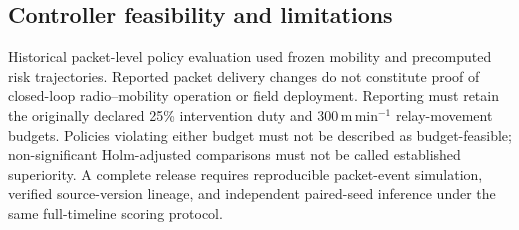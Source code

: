 \subsection{Controller feasibility and limitations}
Historical packet-level policy evaluation used frozen mobility and precomputed
risk trajectories. Reported packet delivery changes do not constitute
proof of closed-loop radio--mobility operation or field deployment. Reporting
must retain the originally declared 25\% intervention duty and
300\,m\,min$^{-1}$ relay-movement budgets. Policies violating either budget
must not be described as budget-feasible; non-significant Holm-adjusted
comparisons must not be called established superiority. A complete release
requires reproducible packet-event simulation, verified source-version lineage,
and independent paired-seed inference under the same full-timeline scoring
protocol.
